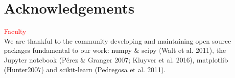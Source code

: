 \documentclass[usenatbib]{mnras}
\begin{document}
\section*{Acknowledgements}
\textcolor{red}{Faculty}\\
We are thankful to the community developing and maintaining open source packages fundamental to our work: numpy
\&  scipy  (Walt  et  al.  2011),  the  Jupyter  notebook  (P\'erez \& Granger 2007; Kluyver et al. 2016), matplotlib (Hunter2007) and  scikit-learn (Pedregosa et al. 2011).






\bsp	%
\label{lastpage}
\end{document}

